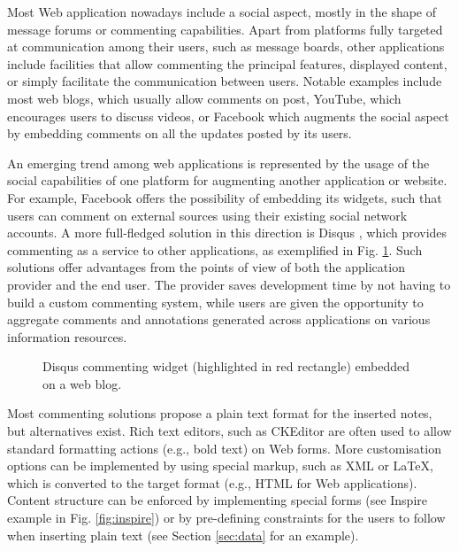 
Most Web application nowadays include a social aspect, mostly in the shape of
message forums or commenting capabilities. Apart from platforms fully targeted
at communication among their users, such as message boards, other applications
include facilities that allow commenting the principal features, displayed
content, or simply facilitate the communication between users.  Notable
examples include most web blogs, which usually allow comments on post, YouTube,
which encourages users to discuss videos, or Facebook which augments the social
aspect by embedding comments on all the updates posted by its users.

An emerging trend among web applications is represented by the usage of the
social capabilities of one platform for augmenting another application or
website. For example, Facebook offers the possibility of embedding its widgets,
such that users can comment on external sources using their existing social
network accounts. A more full-fledged solution in this direction is Disqus
\cite{ref:disqus}, which provides commenting as a service to other
applications, as exemplified in Fig. \ref{fig:disqus}. Such solutions offer
advantages from the points of view of both the application provider and the end
user. The provider saves development time by not having to build a custom
commenting system, while users are given the opportunity to aggregate comments
and annotations generated across applications on various information resources.

\begin{figure}[!h]
  \centering
  \caption[Disqus commenting widget embedded on a web blog]
          {Disqus commenting widget (highlighted in red rectangle) embedded on a web blog.}
  \label{fig:disqus}
\end{figure}

Most commenting solutions propose a plain text format for the inserted notes,
but alternatives exist. Rich text editors, such as CKEditor \cite{ref:cked} are
often used to allow standard formatting actions (e.g., bold text) on Web forms.
More customisation options can be implemented by using special markup, such as
XML or LaTeX, which is converted to the target format (e.g., HTML for Web
applications). Content structure can be enforced by implementing special forms
(see Inspire example in Fig. \ref{fig:inspire}) or by pre-defining constraints
for the users to follow when inserting plain text (see Section \ref{sec:data}
for an example).

